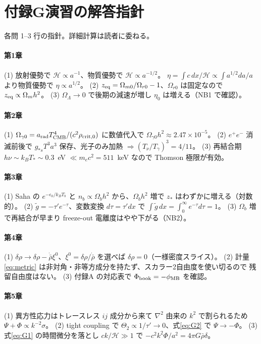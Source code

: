 \section*{付録G\quad 演習の解答指針}

各問 1--3 行の指針。詳細計算は読者に委ねる。

\paragraph{第1章}
(1) 放射優勢で $\mathcal H\propto a^{-1}$、物質優勢で $\mathcal H\propto a^{-1/2}$。
$\eta=\int c\,dx/\mathcal H\propto\int a^{1/2}da/a$ より物質優勢で $\eta\propto a^{1/2}$。
(2) $z_{\rm eq}=\Omega_{m0}/\Omega_{r0}-1$、$\Omega_{r0}$ は固定なので $z_{\rm eq}\propto\Omega_mh^2$。
(3) $\Omega_\Lambda\to0$ で後期の減速が増し $\eta_0$ は増える（NB1 で確認）。

\paragraph{第2章}
(1) $\Omega_{\gamma0}=a_{\rm rad}T_{\rm CMB}^4/(c^2\rho_{\rm crit,0})$ に数値代入で
$\Omega_{\gamma0}h^2\approx2.47\times10^{-5}$。
(2) $e^+e^-$ 消滅前後で $g_{*s}T^3a^3$ 保存、光子のみ加熱 $\Rightarrow(T_\nu/T_\gamma)^3=4/11$。
(3) 再結合期 $h\nu\sim k_BT_*\sim0.3$~eV $\ll m_ec^2=511$~keV なので Thomson 極限が有効。

\paragraph{第3章}
(1) Saha の $e^{-\epsilon_0/k_BT_b}$ と $n_b\propto\Omega_bh^2$ から、$\Omega_bh^2$ 増で
$z_*$ はわずかに増える（対数的）。
(2) $\tilde g=-\tau'e^{-\tau}$、変数変換 $d\tau=\tau'dx$ で
$\int\tilde g\,dx=\int_0^\infty e^{-\tau}d\tau=1$。
(3) $\Omega_b$ 増で再結合が早まり freeze-out 電離度はやや下がる（NB2）。

\paragraph{第4章}
(1) $\delta\rho\to\delta\rho-\dot{\bar\rho}\xi^0$、$\xi^0=\delta\rho/\dot{\bar\rho}$ を選べば
$\delta\rho=0$（一様密度スライス）。
(2) 計量\eqref{eq:metric} は非対角・非等方成分を持たず、スカラー2自由度を使い切るので
残留自由度はない。
(3) 付録A の対応表で $\Phi_{\rm book}=-\phi_{\rm MB}$ を確認。

\paragraph{第5章}
(1) 異方性応力はトレースレス $ij$ 成分から来て $\nabla^2$ 由来の $k^2$ で割られるため
$\Psi+\Phi\propto k^{-2}\sigma$。
(2) tight coupling で $\Theta_2\propto1/\tau'\to0$、式\eqref{eq:G2} で $\Psi\to-\Phi$。
(3) 式\eqref{eq:G1} の時間微分を落とし $ck/\mathcal H\gg1$ で $-c^2k^2\Phi/a^2=4\pi G\bar\rho\delta$。


